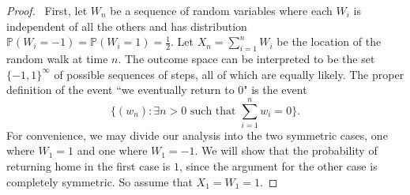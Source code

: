 \documentclass[12pt]{article}
\newcommand{\p}{\mathbb{P}}
\begin{document}
\begin{enumerate}[leftmargin=0cm,itemindent=.5cm,labelwidth=\itemindent,labelsep=0cm,align=left]
\begin{proof}
\begin{comment}
\ First, let $W_i$ be a sequence of random variables where each $W_i$ is independent of all the others and has distribution $\p(W_i = -1) = \p(W_i = 1) = \frac12$.  Let $X_n = \sum\limits_{i=1}^n W_i$  be the location of the random walk at time $n$.  The event ``we eventually return to 0" can be written as
$$
E = \{\exists n > 0 : X_n = 0 \} = \{\exists n > 0 : X_{2n} = 0 \}
$$
(the equality of the two sets above follows from the fact that it is impossible for the walk to return to $0$ in an odd number of steps).
\begin{align*}
\p(E) &= \p [ \{ \exists n > 0 : \sum\limits_{i=1}^{2n} W_i = 0 \} ]
\\
&= \p \left[ \bigcup_{n=1}^\infty \sum\limits_{i=1}^{2n} W_i = 0  \right]
\\
&= \sum\limits_{i=1}^{2n} \p \left[ \sum\limits_{i=1}^{2n} W_i = 0 \right]
\end{align*}
\end{comment}

\ First, let $W_n$ be a sequence of random variables where each $W_i$ is independent of all the others and has distribution $\p(W_i = -1) = \p(W_i = 1) = \frac12$.  Let $X_n = \sum\limits_{i=1}^n W_i$  be the location of the random walk at time $n$.  The outcome space can be interpreted to be the set $\{-1,1\}^{\infty}$ of possible sequences of steps, all of which are equally likely.  The proper definition of the event ``we eventually return to 0" is the event
$$
\{(w_n) : \exists n > 0 \text{ such that } \sum\limits_{i=1}^{n} w_i = 0 \}.
$$
For convenience, we may divide our analysis into the two symmetric cases, one where $W_1 = 1$ and one where $W_1 = -1$.  We will show that the probability of returning home in the first case is $1$, since the argument for the other case is completely symmetric.  So assume that $X_1 = W_1 = 1$.


\end{proof}
\end{enumerate}
\end{document}
